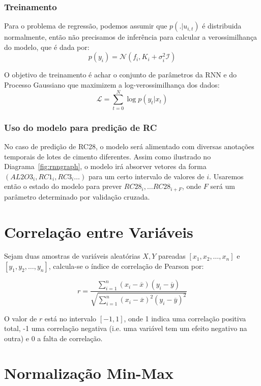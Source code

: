 \subsubsection{Treinamento}

Para o problema de regressão, podemos assumir que $p(. | u_{i,t})$ é distribuida
normalmente, então não precisamos de inferência para calcular a verossimilhança do modelo, que é dada por: \\

\[
p(y_{i}) = \mathcal{N}(f_i,K_i + \sigma_i^2\mathcal{I})
\]

O objetivo de treinamento é achar o conjunto de parâmetros da RNN e do Processo Gaussiano que maximizem a log-verossimilhança dos dados: \\
\[
\mathcal{L} = \sum_{t=0}^N{\log p(y_t|x_t)}
\]


\subsubsection{Uso do modelo para predição de RC}

No caso de predição de RC28, o modelo será alimentado com diversas anotações
temporais de lotes de cimento diferentes. Assim como ilustrado no
Diagrama~\ref{fig:rnngraph}, o modelo irá absorver vetores da forma
$(AL2O3_i,RC1_i,RC3_i \dots)$ para um certo intervalo de valores de $i$.
Usaremos então o estado do modelo para prever $RC28_i, \dots RC28_{i+F}$, onde
$F$ será um parâmetro determinado por validação cruzada.

\section{Correlação entre Variáveis}

Sejam duas amostras de variáveis aleatórias $X,Y$ pareadas $[x_1,x_2, \dots ,
x_n]$ e $[y_1,y_2, \dots , y_n]$, calcula-se o índice de correlação de Pearson por:



\[ r = \frac{{}\sum_{i=1}^{n} (x_i - \overline{x})(y_i - \overline{y})}
  {\sqrt{\sum_{i=1}^{n} (x_i - \overline{x})^2(y_i - \overline{y})^2}} \] 


O valor de $r$ está no intervalo $[-1,1]$, onde 1 indica uma correlação positiva
total, -1 uma correlação negativa (i.e. uma variável tem um efeito negativo na
outra) e 0 a falta de correlação.


\section{Normalização Min-Max}

